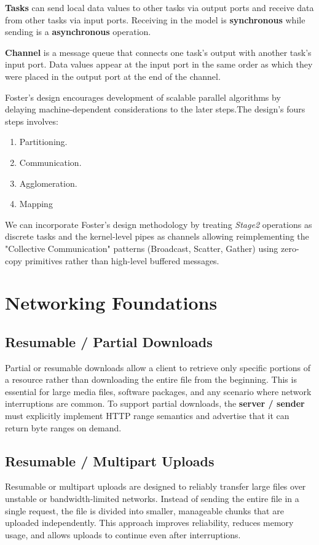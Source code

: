 \documentclass[
	a4paper,
	10pt,
	unnumberedsections,
	twoside, 
]{LTJournalArticle}
\begin{document}
\textbf{Tasks} can send local data values to other tasks via output ports and receive data from other tasks via input ports. Receiving in the model is \textbf{synchronous} while sending is a \textbf{asynchronous} operation.

\textbf{Channel} is a message queue that connects one task's output with another task's input port. Data values appear at the input port in the same order as which they were placed in the output port at the end of the channel.

Foster's design encourages development of scalable parallel algorithms by delaying machine-dependent considerations to the later steps.The design's fours steps involves:
\begin{enumerate}
	\item Partitioning.
	\item Communication.
	\item Agglomeration.
	\item Mapping
\end{enumerate}

We can incorporate Foster’s design methodology by treating \textit{Stage2} operations as discrete tasks and the kernel-level pipes as channels allowing reimplementing the "Collective Communication" patterns (Broadcast, Scatter, Gather) using zero-copy primitives rather than high-level buffered messages.


\section{Networking Foundations}
\label{sec:Network}

\subsection{Resumable / Partial Downloads}
Partial or resumable downloads allow a client to retrieve only specific portions of a resource rather than downloading the entire file from the beginning. This is essential for large media files, software packages, and any scenario where network interruptions are common.  
To support partial downloads, the \textbf{server / sender} must explicitly implement HTTP range semantics and advertise that it can return byte ranges on demand.

\subsection{Resumable / Multipart Uploads}
Resumable or multipart uploads are designed to reliably transfer large files over unstable or bandwidth‑limited networks. Instead of sending the entire file in a single request, the file is divided into smaller, manageable chunks that are uploaded independently. This approach improves reliability, reduces memory usage, and allows uploads to continue even after interruptions.
\end{document}

